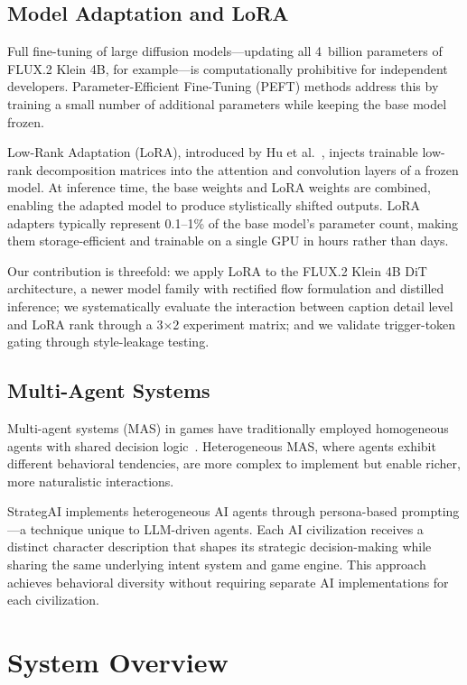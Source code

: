 \documentclass[conference]{IEEEtran}
\begin{document}
\subsection{Model Adaptation and LoRA}

Full fine-tuning of large diffusion models---updating all 4~billion
parameters of FLUX.2 Klein 4B, for example---is computationally prohibitive
for independent developers. Parameter-Efficient Fine-Tuning (PEFT) methods
address this by training a small number of additional parameters while
keeping the base model frozen.

Low-Rank Adaptation (LoRA), introduced by Hu et
al.~\cite{hu2022lora}, injects trainable low-rank decomposition matrices
into the attention and convolution layers of a frozen model. At inference
time, the base weights and LoRA weights are combined, enabling the adapted
model to produce stylistically shifted outputs. LoRA adapters typically
represent 0.1--1\% of the base model's parameter count, making them
storage-efficient and trainable on a single GPU in hours rather than days.

Our contribution is threefold: we apply LoRA to the FLUX.2 Klein 4B DiT
architecture, a newer model family with rectified flow formulation and
distilled inference; we systematically evaluate the interaction between
caption detail level and LoRA rank through a 3$\times$2 experiment matrix;
and we validate trigger-token gating through style-leakage testing.

\subsection{Multi-Agent Systems}

Multi-agent systems (MAS) in games have traditionally employed homogeneous
agents with shared decision logic~\cite{wooldridge2009multiagent}.
Heterogeneous MAS, where agents exhibit different behavioral tendencies,
are more complex to implement but enable richer, more naturalistic
interactions.

StrategAI implements heterogeneous AI agents through persona-based
prompting---a technique unique to LLM-driven agents. Each AI civilization
receives a distinct character description that shapes its strategic
decision-making while sharing the same underlying intent system and game
engine. This approach achieves behavioral diversity without requiring
separate AI implementations for each civilization.

\FloatBarrier
\section{System Overview}
\label{sec:architecture}
\end{document}
